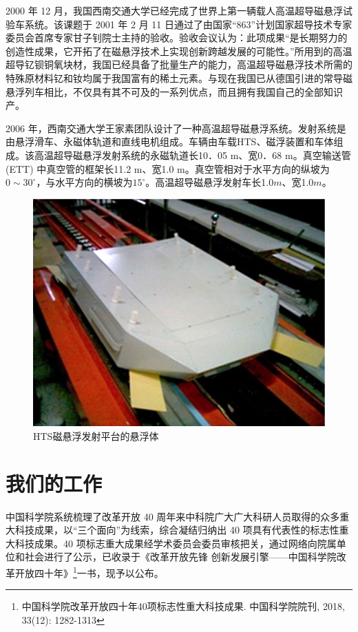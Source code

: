 \documentclass[UTF8, twocolumn]{ctexart}
\begin{document}
    2000 年 12 月，我国西南交通大学已经完成了世界上第一辆载人高温超导磁悬浮试验车系统。该课题于 2001 年 2 月 11 日通过了由国家“863”计划国家超导技术专家委员会首席专家甘子钊院士主持的验收。验收会议认为：此项成果“是长期努力的创造性成果，它开拓了在磁悬浮技术上实现创新跨越发展的可能性。”所用到的高温超导钇钡铜氧块材，我国已经具备了批量生产的能力，高温超导磁悬浮技术所需的特殊原材料钇和钕均属于我国富有的稀土元素。与现在我国已从德国引进的常导磁悬浮列车相比，不仅具有其不可及的一系列优点，而且拥有我国自己的全部知识产。\cite{沈志云2012在我国建设世界上第一条高温超导磁悬浮列车试运行线的建议}

    2006 年，西南交通大学王家素团队设计了一种高温超导磁悬浮系统。发射系统是由悬浮滑车、永磁体轨道和直线电机组成。车辆由车载HTS、磁浮装置和车体组成。该高温超导磁悬浮发射系统的永磁轨道长10．05 m、宽0．68 m。真空输送管(ETT) 中真空管的框架长11.2 m、宽1.0 m。真空管相对于水平方向的纵坡为$0\sim 30^\circ$，与水平方向的横坡为$15^\circ$。高温超导磁悬浮发射车长1.0$m$、宽1.0$m$。\cite{pan2011influence}

    \begin{figure}[ht]
        \centering
        \includegraphics[scale=0.8]{image/pan2010.jpg}
        \caption{HTS磁悬浮发射平台的悬浮体}
        \label{fig:image3}
    \end{figure}

\section{我们的工作}

    中国科学院系统梳理了改革开放 40 周年来中科院广大广大科研人员取得的众多重大科技成果，以“三个面向”为线索，综合凝结归纳出 40 项具有代表性的标志性重大科技成果。40 项标志重大成果经学术委员会委员审核把关，通过网络向院属单位和社会进行了公示，已收录于《改革开放先锋 创新发展引擎——中国科学院改革开放四十年》\footnote{中国科学院改革开放四十年40项标志性重大科技成果. 中国科学院院刊, 2018, 33(12): 1282-1313}一书，现予以公布。
    
\end{document}

